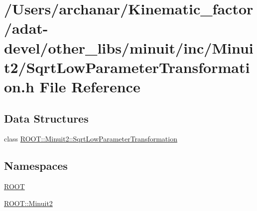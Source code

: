 \hypertarget{adat-devel_2other__libs_2minuit_2inc_2Minuit2_2SqrtLowParameterTransformation_8h}{}\section{/\+Users/archanar/\+Kinematic\+\_\+factor/adat-\/devel/other\+\_\+libs/minuit/inc/\+Minuit2/\+Sqrt\+Low\+Parameter\+Transformation.h File Reference}
\label{adat-devel_2other__libs_2minuit_2inc_2Minuit2_2SqrtLowParameterTransformation_8h}
\subsection*{Data Structures}
\begin{DoxyCompactItemize}
\item 
class \mbox{\hyperlink{classROOT_1_1Minuit2_1_1SqrtLowParameterTransformation}{R\+O\+O\+T\+::\+Minuit2\+::\+Sqrt\+Low\+Parameter\+Transformation}}
\end{DoxyCompactItemize}
\subsection*{Namespaces}
\begin{DoxyCompactItemize}
\item 
 \mbox{\hyperlink{namespaceROOT}{R\+O\+OT}}
\item 
 \mbox{\hyperlink{namespaceROOT_1_1Minuit2}{R\+O\+O\+T\+::\+Minuit2}}
\end{DoxyCompactItemize}
